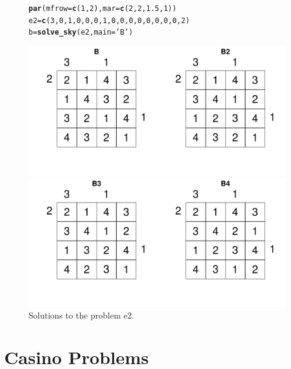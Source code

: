 \documentclass[12pt]{article}\usepackage[]{graphicx}\usepackage[]{color}
\makeatletter
\newcommand{\hlnum}[1]{\textcolor[rgb]{0.686,0.059,0.569}{#1}}%
\newcommand{\hlstr}[1]{\textcolor[rgb]{0.192,0.494,0.8}{#1}}%
\newcommand{\hlstd}[1]{\textcolor[rgb]{0.345,0.345,0.345}{#1}}%
\newcommand{\hlkwb}[1]{\textcolor[rgb]{0.69,0.353,0.396}{#1}}%
\newcommand{\hlkwc}[1]{\textcolor[rgb]{0.333,0.667,0.333}{#1}}%
\newcommand{\hlkwd}[1]{\textcolor[rgb]{0.737,0.353,0.396}{\textbf{#1}}}%
\newenvironment{kframe}{%
 \def\at@end@of@kframe{}%
 \ifinner\ifhmode%
  \def\at@end@of@kframe{\end{minipage}}%
  \begin{minipage}{\columnwidth}%
 \fi\fi%
 \def\FrameCommand##1{\hskip\@totalleftmargin \hskip-\fboxsep
 \colorbox{shadecolor}{##1}\hskip-\fboxsep
     \hskip-\linewidth \hskip-\@totalleftmargin \hskip\columnwidth}%
 \MakeFramed {\advance\hsize-\width
   \@totalleftmargin\z@ \linewidth\hsize
   \@setminipage}}%
 {\par\unskip\endMakeFramed%
 \at@end@of@kframe}
\newenvironment{knitrout}{}{} %
\makeatother
\begin{document}
\begin{figure}[h!]
  \centering
\begin{knitrout}
\color{fgcolor}\begin{kframe}
\begin{alltt}
\hlkwd{par}\hlstd{(}\hlkwc{mfrow}\hlstd{=}\hlkwd{c}\hlstd{(}\hlnum{1}\hlstd{,}\hlnum{2}\hlstd{),}\hlkwc{mar}\hlstd{=}\hlkwd{c}\hlstd{(}\hlnum{2}\hlstd{,}\hlnum{2}\hlstd{,}\hlnum{1.5}\hlstd{,}\hlnum{1}\hlstd{))}
\hlstd{e2} \hlkwb{=} \hlkwd{c}\hlstd{(}\hlnum{3}\hlstd{,}\hlnum{0}\hlstd{,}\hlnum{1}\hlstd{,}\hlnum{0}\hlstd{,} \hlnum{0}\hlstd{,}\hlnum{0}\hlstd{,}\hlnum{1}\hlstd{,}\hlnum{0}\hlstd{,} \hlnum{0}\hlstd{,}\hlnum{0}\hlstd{,}\hlnum{0}\hlstd{,}\hlnum{0}\hlstd{,} \hlnum{0}\hlstd{,}\hlnum{0}\hlstd{,}\hlnum{0}\hlstd{,}\hlnum{2}\hlstd{)}
\hlstd{b} \hlkwb{=} \hlkwd{solve_sky}\hlstd{(e2,} \hlkwc{main} \hlstd{=} \hlstr{'B'}\hlstd{)}
\end{alltt}
\end{kframe}
\includegraphics[width=.7\linewidth]{figure/unnamed-chunk-7-1} 

\includegraphics[width=.7\linewidth]{figure/unnamed-chunk-7-2} 

\end{knitrout}
\caption{Solutions to the problem e2.}
\label{fig:plot3}
\end{figure}

\newpage

\section{Casino Problems}
\end{document}
